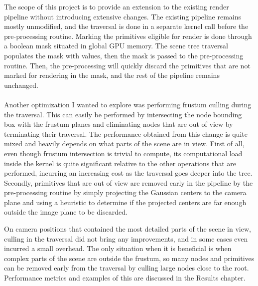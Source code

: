 The scope of this project is to provide an extension to the existing render pipeline without introducing extensive changes. The existing pipeline remains mostly unmodified, and the traversal is done in a separate kernel call before the pre-processing routine. Marking the primitives eligible for render is done through a boolean mask situated in global GPU memory. The scene tree traversal populates the mask with values, then the mask is passed to the pre-processing routine. Then, the pre-processing will quickly discard the primitives that are not marked for rendering in the mask, and the rest of the pipeline remains unchanged.

\paragraph{}
Another optimization I wanted to explore was performing frustum culling during the traversal. This can easily be performed by intersecting the node bounding box with the frustum planes and eliminating nodes that are out of view by terminating their traversal. The performance obtained from this change is quite mixed and heavily depends on what parts of the scene are in view. First of all, even though frustum intersection is trivial to compute, its computational load inside the kernel is quite significant relative to the other operations that are performed, incurring an increasing cost as the traversal goes deeper into the tree. Secondly, primitives that are out of view are removed early in the pipeline by the pre-processing routine by simply projecting the Gaussian centers to the camera plane and using a heuristic to determine if the projected centers are far enough outside the image plane to be discarded. 

On camera positions that contained the most detailed parts of the scene in view, culling in the traversal did not bring any improvements, and in some cases even incurred a small overhead. The only situation when it is beneficial is when complex parts of the scene are outside the frustum, so many nodes and primitives can be removed early from the traversal by culling large nodes close to the root. Performance metrics and examples of this are discussed in the Results chapter. 